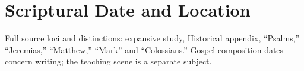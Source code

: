 \section{Scriptural Date and Location}


{\footnotesize Full source loci and distinctions: expansive study, Historical appendix, ``Psalms,'' ``Jeremias,'' ``Matthew,'' ``Mark'' and ``Colossians.'' Gospel composition dates concern writing; the teaching scene is a separate subject.}

